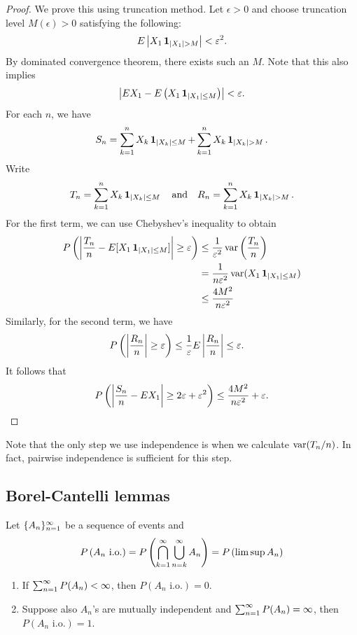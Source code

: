 \documentclass[a4paper]{article}
\begin{document}
\begin{proof}
  We prove this using truncation method.
  Let $\epsilon > 0$ and choose truncation level $M (\epsilon) > 0$
  satisfying the following:
  \begin{align*}
    E \left\lvert X_1 \operatorname{\mathbf{1}}_{\left\lvert X_1\right\rvert > M}\right\rvert < \varepsilon^2.
  \end{align*}
  By dominated convergence theorem, there exists such an $M$.
  Note that this also implies
  \[
    \left\lvert E X_1 - E \left( X_1 \operatorname{\mathbf{1}}_{\left\lvert X_1\right\rvert \leq M} \right)\right\rvert < \varepsilon.
  \]
  For each $n$, we have
  \[
    S_n = \sum_{k=1}^n X_k \operatorname{\mathbf{1}}_{\left\lvert X_k\right\rvert \leq M} +
    \sum_{k=1}^n X_k \operatorname{\mathbf{1}}_{\left\lvert X_k\right\rvert > M}.
  \]
  Write
  \[
    T_n = \sum_{k=1}^n X_k \operatorname{\mathbf{1}}_{\left\lvert X_k\right\rvert \leq M} \quad
    \text{and} \quad
    R_n = \sum_{k=1}^n X_k \operatorname{\mathbf{1}}_{\left\lvert X_k\right\rvert > M}.
  \]
  For the first term, we can use Chebyshev's inequality to obtain
  \begin{align*}
    P \left( \left\lvert \frac{T_n}{n} -
               E [X_1 \operatorname{\mathbf{1}}_{\left\lvert X_1\right\rvert \leq M}]\right\rvert \geq \varepsilon \right)
     & \leq \frac{1}{\varepsilon^2} \operatorname{var} \left( \frac{T_n}{n} \right) \\
     & = \frac{1}{n \varepsilon^2} \operatorname{var} (X_1 \operatorname{\mathbf{1}}_{\left\lvert X_1\right\rvert \leq M}) \\
     & \leq \frac{4 M^2}{n \varepsilon^2}
  \end{align*}
  Similarly, for the second term, we have
  \begin{align*}
    P \left( \left\lvert \frac{R_n}{n}\right\rvert \geq \varepsilon \right)
     & \leq \frac{1}{\varepsilon} E \left\lvert \frac{R_n}{n}\right\rvert \leq \varepsilon.
  \end{align*}
  It follows that
  \[
    P \left( \left\lvert \frac{S_n}{n} - E X_1\right\rvert \geq
    2 \varepsilon + \varepsilon^2 \right)
    \leq \frac{4 M^2}{n \varepsilon^2} + \varepsilon.
  \]
\end{proof}

\begin{remark}
  Note that the only step we use independence is when we calculate
  $\operatorname{var} (T_n / n)$. In fact, pairwise independence is sufficient
  for this step.
\end{remark}

\subsection{Borel-Cantelli lemmas}

\begin{thm}
  Let $\{ A_n \}_{n=1}^\infty$ be a sequence of events and
  \[
    P \left( A_n \text{ i.o.} \right)
    = P \left( \bigcap_{k=1}^\infty \bigcup_{n=k}^\infty A_n \right)
    = P \left( \limsup A_n \right)
  \]
  \begin{enumerate}
    \item If $\sum_{n=1}^\infty P (A_n) < \infty$, then
          $P \left( A_n \text{ i.o.} \right) = 0$.

    \item Suppose also $A_n$'s are mutually independent
          and $\sum_{n=1}^\infty P (A_n) = \infty$, then
          $P \left( A_n \text{ i.o.} \right) = 1$.
  \end{enumerate}
\end{thm}
\end{document}
